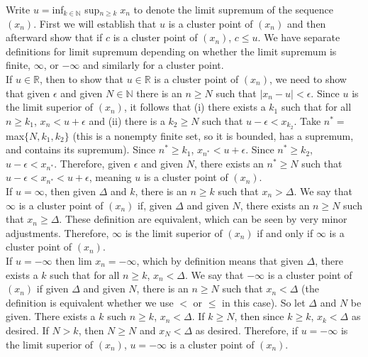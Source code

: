 \documentclass[a4paper]{article}
\begin{document}
Write $u = $inf$_{k\in \mathbb{N}} $ sup$_{n \geq k} \; x_n$ to denote the limit supremum of the sequence $(x_n)$. First we will establish that $u$ is a cluster point of $(x_n)$ and then afterward show that if $c$ is a cluster point of $(x_n)$, $c\leq u$. We have separate definitions for limit supremum depending on whether the limit supremum is finite, $\infty$, or $-\infty$ and similarly for a cluster point. \\


If $u \in \mathbb{R}$, then to show that $u \in \mathbb{R}$ is a cluster point of $(x_n)$, we need to show that given $\epsilon$ and given $N \in \mathbb{N}$ there is an $n \geq N$ such that $|x_n-u| < \epsilon$. Since $u$ is the limit superior of $(x_n)$, it follows that (i)  there exists a $k_1$ such that for all $n \geq k_1$, $x_n < u + \epsilon$ and (ii) there is a $k_2 \geq N$ such that $u - \epsilon < x_{k_2}$. Take $n^* = $ max$\{N,k_1,k_2\}$ (this is a nonempty finite set, so it is bounded, has a supremum, and contains its supremum). Since $n^* \geq k_1$, $x_{n^*} < u + \epsilon$. Since $n^* \geq k_2$, $u - \epsilon < x_{n^*}$. Therefore, given $\epsilon$ and given $N$, there exists an $n^* \geq N$ such that $u - \epsilon < x_{n^*} < u + \epsilon$, meaning $u$ is a cluster point of $(x_n)$.\\

If $u = \infty$, then given $\Delta$ and $k$, there is an $n \geq k$ such that $x_n > \Delta$. We say that $\infty$ is a cluster point of $(x_n)$ if, given $\Delta$ and given $N$, there exists an $n \geq N$ such that $x_n \geq \Delta$. These definition are equivalent, which can be seen by very minor adjustments. Therefore, $\infty$ is the limit superior of $(x_n)$ if and only if $\infty$ is a cluster point of $(x_n)$. \\

If $u = -\infty$ then lim $x_n = -\infty$, which by definition means that given $\Delta$, there exists a $k$ such that for all $n \geq k$, $x_n < \Delta$. We say that $-\infty$ is a cluster point of $(x_n)$ if given $\Delta$ and given $N$, there is an $n \geq N$ such that $x_n < \Delta$ (the definition is equivalent whether we use $<$ or $\leq$ in this case). So let $\Delta$ and $N$ be given. There exists a $k$ such $n \geq k$, $x_n < \Delta$. If $k \geq N$, then since $k\geq k$, $x_k < \Delta$ as desired. If $N>k$, then $N\geq N$ and $x_N < \Delta$ as desired. Therefore, if $u = -\infty$ is the limit superior of $(x_n)$, $u = -\infty$ is a cluster point of $(x_n)$. \\
\end{document}
